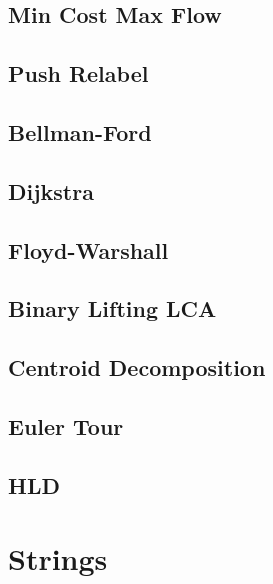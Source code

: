 \subsection{Min Cost Max Flow}
\raggedbottom
\hrulefill
\subsection{Push Relabel}
\raggedbottom
\hrulefill
\subsection{Bellman-Ford}
\raggedbottom
\hrulefill
\subsection{Dijkstra}
\raggedbottom
\hrulefill
\subsection{Floyd-Warshall}
\raggedbottom
\hrulefill
\subsection{Binary Lifting LCA}
\raggedbottom
\hrulefill
\subsection{Centroid Decomposition}
\raggedbottom
\hrulefill
\subsection{Euler Tour}
\raggedbottom
\hrulefill
\subsection{HLD}
\raggedbottom
\hrulefill
\newpage

\section{Strings}
